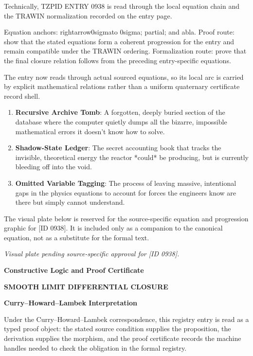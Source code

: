 Technically, TZPID ENTRY 0938 is read through the local equation chain and the TRAWIN normalization recorded on the entry page.

Equation anchors: rightarrow0sigmato 0sigma; partial; and abla. Proof route: show that the stated equations form a coherent progression for the entry and remain compatible under the TRAWIN ordering. Formalization route: prove that the final closure relation follows from the preceding entry-specific equations.

The entry now reads through actual sourced equations, so its local arc is carried by explicit mathematical relations rather than a uniform quaternary certificate record shell.
\endgroup

\begin{enumerate}[leftmargin=1.6em,itemsep=6pt,topsep=4pt]
\item \textbf{Recursive Archive Tomb}: A forgotten, deeply buried section of the database where the computer quietly dumps all the bizarre, impossible mathematical errors it doesn't know how to solve.
\item \textbf{Shadow-State Ledger}: The secret accounting book that tracks the invisible, theoretical energy the reactor *could* be producing, but is currently bleeding off into the void.
\item \textbf{Omitted Variable Tagging}: The process of leaving massive, intentional gaps in the physics equations to account for forces the engineers know are there but simply cannot understand.
\end{enumerate}

\begingroup\footnotesize\sloppy
The visual plate below is reserved for the source-specific equation and progression graphic for [ID 0938]. It is included only as a companion to the canonical equation, not as a substitute for the formal text.
\par\endgroup
\begingroup\footnotesize\itshape
Visual plate pending source-specific approval for [ID 0938].
\par\endgroup

\clearpage
\begingroup\tzpsupportsetup
\noindent\textbf{\fontsize{10.8pt}{12.8pt}\selectfont [ID 0938] Constructive Logic and Proof Certificate}\par
\noindent\textbf{\fontsize{10pt}{12pt}\selectfont SMOOTH LIMIT DIFFERENTIAL CLOSURE}\par
\vspace{0.45em}
\begingroup
\footnotesize
\setlength{\parskip}{0.22em}
\setlength{\parindent}{0pt}
\noindent\textbf{Curry--Howard--Lambek Interpretation}\par
Under the Curry--Howard--Lambek correspondence, this registry entry is read as a typed proof
object: the stated source condition supplies the proposition, the derivation supplies the
morphism, and the proof certificate records the machine handles needed to check the obligation
in the formal registry.

